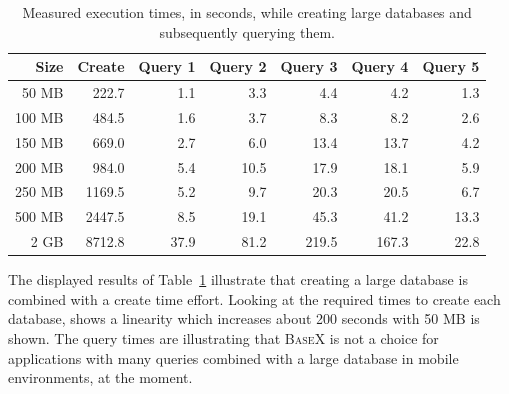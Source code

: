 \begin {table}[htpb] 
  \centering
\begin {tabular} {|r|r|r|r|r|r|r|}
	\hline
	Size&Create&Query 1&Query 2&Query 3&Query 4&Query 5\\
	\hline
	50 MB&222.7&1.1&3.3&4.4&4.2&1.3\\
       100 MB&484.5&1.6&3.7&8.3&8.2&2.6\\
       150 MB&669.0&2.7&6.0&13.4&13.7&4.2\\
       200 MB&984.0&5.4&10.5&17.9&18.1&5.9\\
       250 MB&1169.5&5.2&9.7&20.3&20.5&6.7\\
       500 MB&2447.5&8.5&19.1&45.3&41.2&13.3\\
       \hline
       \hline
       2 GB& 8712.8&37.9&81.2&219.5&167.3&22.8\\
	\hline
\end {tabular}
\caption {Measured execution times, in seconds, while creating large databases and subsequently querying them.}
\label {tab:basex-constraints}
\end {table}
The displayed results of Table~\ref{tab:basex-constraints} illustrate that creating a large database is combined with a create time effort. 
Looking at the required times to create each database, shows a linearity which increases about 200 seconds with 50 MB is shown.
The query times are illustrating that \textsc{BaseX} is not a choice for applications with many queries combined with a large database in mobile environments, at the moment.
